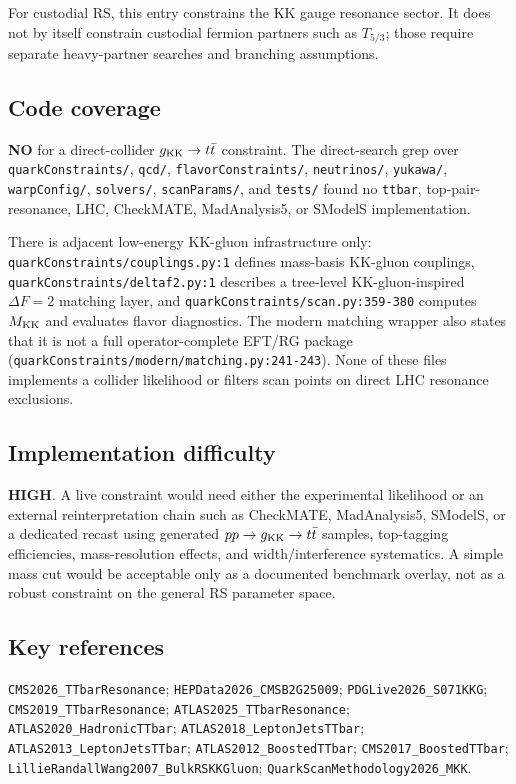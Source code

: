 For custodial RS, this entry constrains the KK gauge resonance sector.  It does
not by itself constrain custodial fermion partners such as \(T_{5/3}\); those
require separate heavy-partner searches and branching assumptions.

\subsection*{Code coverage}
\textbf{NO} for a direct-collider \(g_{\rm KK}\to t\bar t\) constraint.  The
direct-search grep over \texttt{quarkConstraints/}, \texttt{qcd/},
\texttt{flavorConstraints/}, \texttt{neutrinos/}, \texttt{yukawa/},
\texttt{warpConfig/}, \texttt{solvers/}, \texttt{scanParams/}, and
\texttt{tests/} found no \texttt{ttbar}, top-pair-resonance, LHC, CheckMATE,
MadAnalysis5, or SModelS implementation.

There is adjacent low-energy KK-gluon infrastructure only:
\texttt{quarkConstraints/couplings.py:1} defines mass-basis KK-gluon couplings,
\texttt{quarkConstraints/deltaf2.py:1} describes a tree-level KK-gluon-inspired
\(\Delta F=2\) matching layer, and \texttt{quarkConstraints/scan.py:359-380}
computes \(M_{\rm KK}\) and evaluates flavor diagnostics.  The modern matching
wrapper also states that it is not a full operator-complete EFT/RG package
(\texttt{quarkConstraints/modern/matching.py:241-243}).  None of these files
implements a collider likelihood or filters scan points on direct LHC
resonance exclusions.

\subsection*{Implementation difficulty}
\textbf{HIGH}.  A live constraint would need either the experimental likelihood
or an external reinterpretation chain such as CheckMATE, MadAnalysis5, SModelS,
or a dedicated recast using generated \(pp\to g_{\rm KK}\to t\bar t\) samples,
top-tagging efficiencies, mass-resolution effects, and width/interference
systematics.  A simple mass cut would be acceptable only as a documented
benchmark overlay, not as a robust constraint on the general RS parameter
space.

\subsection*{Key references}
\texttt{CMS2026\_TTbarResonance}; \texttt{HEPData2026\_CMSB2G25009};
\texttt{PDGLive2026\_S071KKG}; \texttt{CMS2019\_TTbarResonance};
\texttt{ATLAS2025\_TTbarResonance}; \texttt{ATLAS2020\_HadronicTTbar};
\texttt{ATLAS2018\_LeptonJetsTTbar}; \texttt{ATLAS2013\_LeptonJetsTTbar};
\texttt{ATLAS2012\_BoostedTTbar}; \texttt{CMS2017\_BoostedTTbar};
\texttt{LillieRandallWang2007\_BulkRSKKGluon};
\texttt{QuarkScanMethodology2026\_MKK}.
